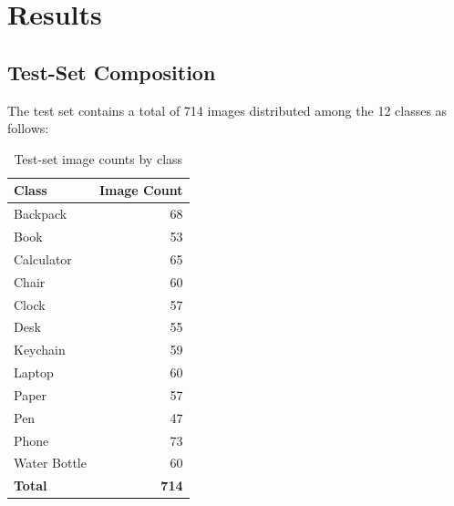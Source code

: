 \documentclass[10pt]{article}
\begin{document}
\section{Results}

\subsection{Test-Set Composition}

The test set contains a total of 714 images distributed among the 12 classes as follows:

\begin{table}[h!]
    \centering
    \caption{Test-set image counts by class}
    \label{tab:test_counts}
    \begin{tabular}{|l|r|}
        \hline
        \textbf{Class}       & \textbf{Image Count} \\ \hline
        Backpack             & 68                   \\
        Book                 & 53                   \\
        Calculator           & 65                   \\
        Chair                & 60                   \\
        Clock                & 57                   \\
        Desk                 & 55                   \\
        Keychain             & 59                   \\
        Laptop               & 60                   \\
        Paper                & 57                   \\
        Pen                  & 47                   \\
        Phone                & 73                   \\
        Water Bottle         & 60                   \\ \hline
        \textbf{Total}       & \textbf{714}         \\ \hline
    \end{tabular}
\end{table}
\end{document}
